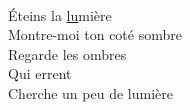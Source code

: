 \\
Éteins la \underline{lu}mière \\
Montre-moi ton coté sombre \\
Regarde les ombres \\
Qui errent \\
Cherche un peu de lumière \\
